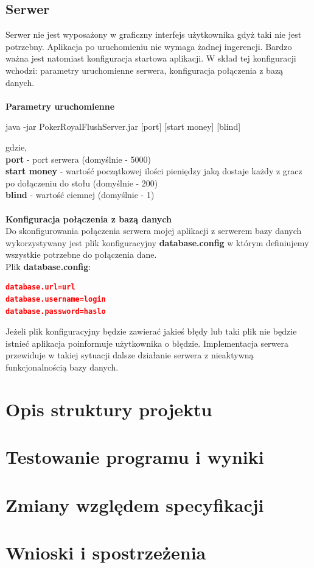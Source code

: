 \documentclass{article}
\begin{document}
    \subsection{Serwer}
        Serwer nie jest wyposażony w graficzny interfejs użytkownika gdyż taki nie jest potrzebny.
        Aplikacja po uruchomieniu nie wymaga żadnej ingerencji.
        Bardzo ważna jest natomiast konfiguracja startowa aplikacji.
        W skład tej konfiguracji wchodzi: parametry uruchomienne serwera, konfiguracja połączenia z bazą danych.\\
        \\
        \textbf{Parametry uruchomienne}
            \begin{center}
                java -jar PokerRoyalFlushServer.jar [port] [start money] [blind]
            \end{center}
            gdzie,\\
            \textbf{port} - port serwera (domyślnie - 5000)\\
            \textbf{start money} - wartość początkowej ilości pieniędzy jaką dostaje każdy z gracz po dołączeniu do stołu (domyślnie - 200)\\
            \textbf{blind} - wartość ciemnej (domyślnie - 1)\\
        \\
        \textbf{Konfiguracja połączenia z bazą danych}\\
            Do skonfigurowania połączenia serwera mojej aplikacji z serwerem bazy danych wykorzystywany jest plik konfiguracyjny \textbf{database.config} w którym definiujemy wszystkie potrzebne do połączenia dane.\\
            Plik \textbf{database.config}:
            
            \begin{lstlisting}[language=json, firstnumber=1]
database.url=url
database.username=login
database.password=haslo
            \end{lstlisting}
            \vspace{2mm}
            
            Jeżeli plik konfiguracyjny będzie zawierać jakieś błędy lub taki plik nie będzie istnieć aplikacja poinformuje użytkownika o błędzie.
            Implementacja serwera przewiduje w takiej sytuacji dalsze działanie serwera z nieaktywną funkcjonalnością bazy danych.
        

\section{Opis struktury projektu}


\section{Testowanie programu i wyniki}


\section{Zmiany względem specyfikacji}


\section{Wnioski i spostrzeżenia}
\end{document}
